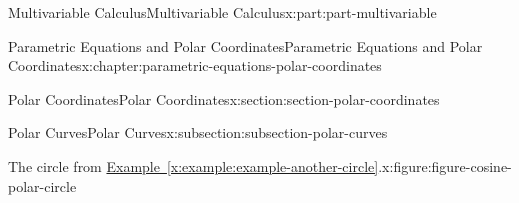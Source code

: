 \documentclass[twoside,10pt,]{book}
\newcommand{\xreffont}{\relax}
\numberwithin{equation}{part}
\begin{document}
\begin{partptx}{Multivariable Calculus}{}{Multivariable Calculus}{}{}{x:part:part-multivariable}
\begin{chapterptx}{Parametric Equations and Polar Coordinates}{}{Parametric Equations and Polar Coordinates}{}{}{x:chapter:parametric-equations-polar-coordinates}
\begin{sectionptx}{Polar Coordinates}{}{Polar Coordinates}{}{}{x:section:section-polar-coordinates}
\begin{subsectionptx}{Polar Curves}{}{Polar Curves}{}{}{x:subsection:subsection-polar-curves}
\begin{figureptx}{The circle from \hyperref[x:example:example-another-circle]{Example~{\xreffont\ref{x:example:example-another-circle}}}.}{x:figure:figure-cosine-polar-circle}{}%
\begin{image}{0}{1}{0}%
\end{image}
\end{figureptx}
\end{subsectionptx}
\end{sectionptx}
\end{chapterptx}
\end{partptx}
\end{document}
